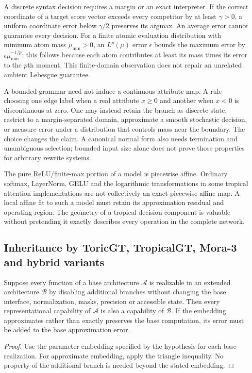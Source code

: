 A discrete syntax decision requires a margin or an exact interpreter. If the correct coordinate of a target score vector exceeds every competitor by at least $\gamma>0$, a uniform coordinate error below $\gamma/2$ preserves its argmax. An average error cannot guarantee every decision. For a finite atomic evaluation distribution with minimum atom mass $\mu_{\min}>0$, an $L^p(\mu)$ error $\epsilon$ bounds the maximum error by $\epsilon\mu_{\min}^{-1/p}$; this follows because each atom contributes at least its mass times its error to the $p$th moment. This finite-domain observation does not repair an unrelated ambient Lebesgue guarantee.

A bounded grammar need not induce a continuous attribute map. A rule choosing one edge label when a real attribute $x\ge0$ and another when $x<0$ is discontinuous at zero. One may instead retain the branch as discrete state, restrict to a margin-separated domain, approximate a smooth stochastic decision, or measure error under a distribution that controls mass near the boundary. The choice changes the claim. A canonical normal form also needs termination and unambiguous selection; bounded input size alone does not prove those properties for arbitrary rewrite systems.

The pure ReLU/finite-max portion of a model is piecewise affine. Ordinary softmax, LayerNorm, GELU and the logarithmic transformations in some tropical attention implementations are not collectively an exact piecewise-affine map. A local affine fit to such a model must retain its approximation residual and operating region. The geometry of a tropical decision component is valuable without pretending it exactly describes every operation in the complete network.

\subsection{Inheritance by ToricGT, TropicalGT, Mora-3 and hybrid variants}

\begin{proposition}
Suppose every function of a base architecture $\mathcal A$ is realizable in an extended architecture $\mathcal B$ by disabling additional branches without changing the base interface, normalization, masks, precision or accessible state. Then every representational capability of $\mathcal A$ is also a capability of $\mathcal B$. If the embedding approximates rather than exactly preserves the base computation, its error must be added to the base approximation error.
\end{proposition}
\begin{proof}
Use the parameter embedding specified by the hypothesis for each base realization. For approximate embedding, apply the triangle inequality. No property of the additional branch is needed beyond the stated embedding.
\end{proof}

